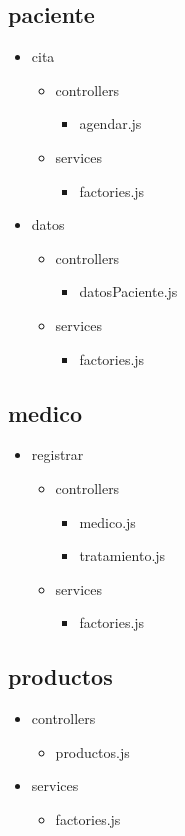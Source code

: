 	\subsection{paciente}
		\begin{itemize}
		\item cita
		\begin{itemize}
			\item controllers
			\begin{itemize}
				\item agendar.js
			\end{itemize}
			\item services
			\begin{itemize}
				\item factories.js
			\end{itemize}
		\end{itemize}
		\item datos
		\begin{itemize}
		\item controllers
		\begin{itemize}
			\item datosPaciente.js
		\end{itemize}
		\item services
		\begin{itemize}
		\item factories.js
		\end{itemize}
		\end{itemize}
	\end{itemize}
	\subsection{medico}
		\begin{itemize}
		\item registrar
		\begin{itemize}
			\item controllers
			\begin{itemize}
				\item medico.js
				\item tratamiento.js
			\end{itemize}
			\item services
			\begin{itemize}
				\item factories.js
			\end{itemize}
		\end{itemize}
	\end{itemize}
	\subsection{productos}
		\begin{itemize}
			\item controllers
			\begin{itemize}
				\item productos.js
			\end{itemize}
			\item services
			\begin{itemize}
				\item factories.js
			\end{itemize}
		\end{itemize}
	
